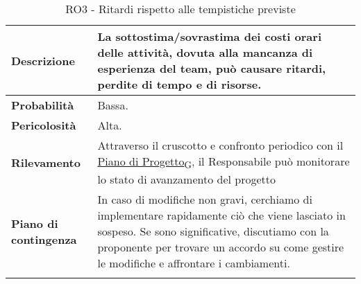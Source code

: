 \begin{longtable}{ | l | p{10cm} | }
	\hline
	\textbf{Descrizione}          & La sottostima/sovrastima dei costi orari delle attività, dovuta alla mancanza di esperienza del team, può causare ritardi, perdite di tempo e di risorse.                                                                                                \\
	\hline
	\textbf{Probabilità}          & Bassa.                                                                                                                                                                                                                                                   \\
	\hline
	\textbf{Pericolosità}         & Alta.                                                                                                                                                                                                                                                    \\
	\hline
	\textbf{Rilevamento}          & Attraverso il cruscotto e confronto periodico con il \href{https://7last.github.io/docs/rtb/documentazione-interna/glossario#piano-di-progetto}{Piano di Progetto\textsubscript{G}}, il Responsabile può monitorare lo stato di avanzamento del progetto \\
	\hline
	\textbf{Piano di contingenza} & In caso di modifiche non gravi, cerchiamo di implementare rapidamente ciò che viene lasciato in sospeso. Se sono significative, discutiamo con la proponente per trovare un accordo su come gestire le modifiche e affrontare i cambiamenti.             \\
	\hline
	\caption{RO3 - Ritardi rispetto alle tempistiche previste}
	\label{table:3}
\end{longtable}


